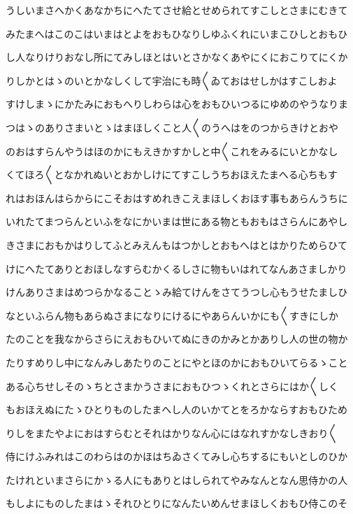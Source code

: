 \documentclass[a4paper,11pt,landscape]{ltjtarticle}
\begin{document}
うしいまさへかくあなかちにへたてさせ給とせめられてすこしとさまにむきて
\par\medskip
みたまへはこのこはいまはとよをおもひなりしゆふくれにいまこひしとおもひ
\par\medskip
し人なりけりおなし所にてみしほとはいとさかなくあやにくにおこりてにくか
\par\medskip
りしかとはゝのいとかなしくして宇治にも時〱ゐておはせしかはすこしおよ
\par\medskip
すけしまゝにかたみにおもへりしわらは心をおもひいつるにゆめのやうなりま
\par\medskip
つはゝのありさまいとゝはまほしくこと人〱のうへはをのつからきけとおや
\par\medskip
のおはすらんやうはほのかにもえきかすかしと中〱これをみるにいとかなし
\par\medskip
くてほろ〱となかれぬいとおかしけにてすこしうちおほえたまへる心ちもす
\par\medskip
れはおほんはらからにこそおはすめれきこえまほしくおほす事もあらんうちに
\par\medskip
いれたてまつらんといふをなにかいまは世にある物ともおもはさらんにあやし
\par\medskip
きさまにおもかはりしてふとみえんもはつかしとおもへはとはかりためらひて
\par\medskip
けにへたてありとおほしなすらむかくるしさに物もいはれてなんあさましかり
\par\medskip
けんありさまはめつらかなることゝみ給てけんをさてうつし心もうせたましひ
\par\medskip
なといふらん物もあらぬさまになりにけるにやあらんいかにも〱すきにしか
\par\medskip
たのことを我なからさらにえおもひいてぬにきのかみとかありし人の世の物か
\par\medskip
たりすめりし中になんみしあたりのことにやとほのかにおもひいてらるゝこと
\par\medskip
ある心ちせしそのゝちとさまかうさまにおもひつゝくれとさらにはか〱しく
\par\medskip
もおほえぬにたゝひとりものしたまへし人のいかてとをろかならすおもひため
\par\medskip
りしをまたやよにおはすらむとそれはかりなん心にはなれすかなしきおり〱
\par\medskip
侍にけふみれはこのわらはのかほはちゐさくてみし心ちするにもいとしのひか
\par\medskip
たけれといまさらにかゝる人にもありとはしられてやみなんとなん思侍かの人
\par\medskip
もしよにものしたまはゝそれひとりになんたいめんせまほしくおもひ侍このそ
\end{document}
